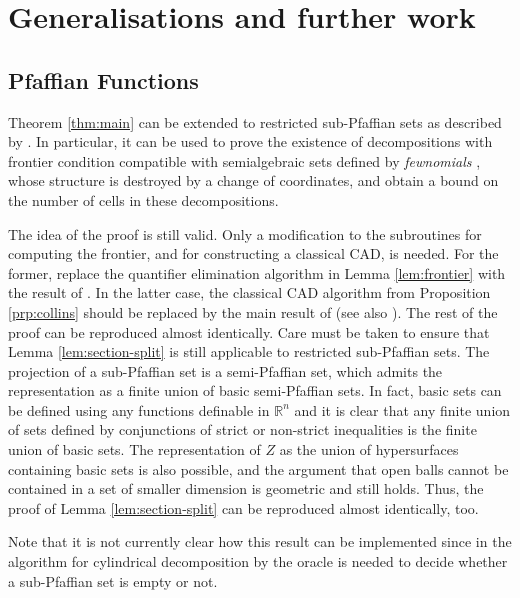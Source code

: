 \documentclass[
]{book}
\theoremstyle{definition}
\theoremstyle{definition}
\theoremstyle{definition}
\theoremstyle{definition}
\theoremstyle{remark}
\begin{document}
\hypertarget{generalisations-and-further-work}{%
\section{Generalisations and further work}\label{generalisations-and-further-work}}

\hypertarget{sec:pfaffian}{%
\subsection{Pfaffian Functions}\label{sec:pfaffian}}

Theorem \ref{thm:main} can be extended to restricted sub-Pfaffian sets as described by \citet{gv04}.
In particular, it can be used to prove the existence of decompositions with frontier condition compatible with semialgebraic sets defined by \emph{fewnomials} \citep[Section 2.6]{gv04}, whose structure is destroyed by a change of coordinates, and obtain a bound on the number of cells in these decompositions.

The idea of the proof is still valid. Only a modification to the subroutines for computing the frontier, and for constructing a classical CAD, is needed. For the former, replace the quantifier elimination algorithm in Lemma \ref{lem:frontier} with the result of \citep[Section 5]{gv04}. In the latter case, the classical CAD algorithm from Proposition \ref{prp:collins} should be replaced by the main result of \citet{gv01} (see also \citep[Section 7]{gv04}). The rest of the proof can be reproduced almost identically.
Care must be taken to ensure that Lemma \ref{lem:section-split} is still applicable to restricted sub-Pfaffian sets. The projection of a sub-Pfaffian set is a semi-Pfaffian set, which admits the representation as a finite union of basic semi-Pfaffian sets.
In fact, basic sets can be defined using any functions definable in \(\mathbb{R}^n\) and it is clear that any finite union of sets defined by conjunctions of strict or non-strict inequalities is the finite union of basic sets. The representation of \(Z\) as the union of hypersurfaces containing basic sets is also possible, and the argument that open balls cannot be contained in a set of smaller dimension is geometric and still holds. Thus, the proof of Lemma \ref{lem:section-split} can be reproduced almost identically, too.

Note that it is not currently clear how this result can be implemented since in the algorithm for cylindrical decomposition by \citet{gv01} the oracle is needed to decide whether a sub-Pfaffian set is empty or not.
\end{document}
